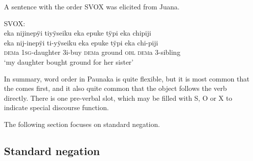 A sentence with the order SVOX was elicited from Juana.


\ea\label{ex:SVOX}
\begingl
\glpreamble \textup{SVOX:}\\ eka nijinepÿi tiyÿseiku eka epuke tÿpi eka chipiji\\
\gla eka nij-inepÿi ti-yÿseiku eka epuke tÿpi eka chi-piji\\
\glb \textsc{dem}a 1\textsc{sg}-daughter 3i-buy \textsc{dem}a ground \textsc{obl} \textsc{dem}a 3-sibling\\
\glft ‘my daughter bought ground for her sister’
\endgl
\trailingcitation{[jxx-e191021e-2]}
\xe


%
%






In summary, word order in Paunaka is quite flexible, but it is most common that the  comes first, and it also quite common that the object follows the verb directly. There is one pre-verbal slot, which may be filled with S, O or X to indicate special discourse function.


The following section focuses on standard negation.




\subsection{Standard negation}\label{sec:Negation}

